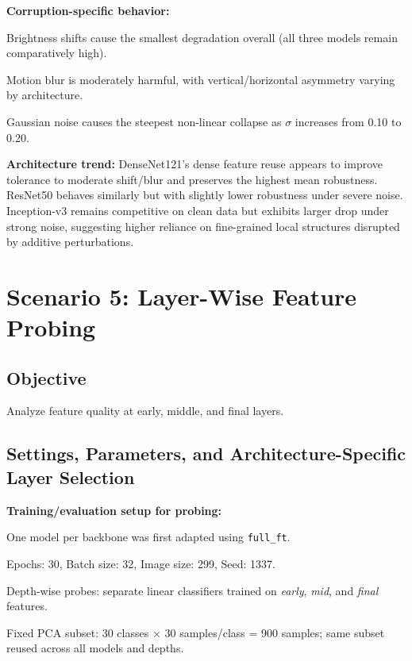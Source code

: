 \documentclass[11pt,a4paper]{report}
\renewenvironment{leftbar}[1][\hsize]
  {\def\FrameCommand{{\color{subsectionblue}\vrule width 3pt}\hspace{0pt}}%
   \MakeFramed{\hsize#1\advance\hsize-\width\FrameRestore}}
  {\endMakeFramed}
\renewenvironment{itemize}{\begin{leftbar}\begin{originalitemize}}{\end{originalitemize}\end{leftbar}}
\begin{document}
\textbf{Corruption-specific behavior:}
\begin{itemize}
  \item Brightness shifts cause the smallest degradation overall (all three models remain comparatively high).
  \item Motion blur is moderately harmful, with vertical/horizontal asymmetry varying by architecture.
  \item Gaussian noise causes the steepest non-linear collapse as $\sigma$ increases from 0.10 to 0.20.
\end{itemize}

\textbf{Architecture trend:} DenseNet121's dense feature reuse appears to improve tolerance to moderate shift/blur and preserves the highest mean robustness. ResNet50 behaves similarly but with slightly lower robustness under severe noise. Inception-v3 remains competitive on clean data but exhibits larger drop under strong noise, suggesting higher reliance on fine-grained local structures disrupted by additive perturbations.

\chapter{Scenario 5: Layer-Wise Feature Probing}

\section{Objective}
Analyze feature quality at early, middle, and final layers.

\section{Settings, Parameters, and Architecture-Specific Layer Selection}
\textbf{Training/evaluation setup for probing:}
\begin{itemize}
  \item One model per backbone was first adapted using \texttt{full\_ft}.
  \item Epochs: 30, Batch size: 32, Image size: 299, Seed: 1337.
  \item Depth-wise probes: separate linear classifiers trained on \textit{early}, \textit{mid}, and \textit{final} features.
  \item Fixed PCA subset: 30 classes $\times$ 30 samples/class = 900 samples; same subset reused across all models and depths.
\end{itemize}
\end{document}
